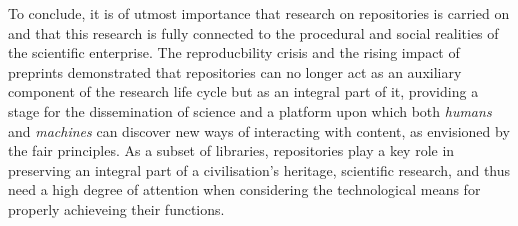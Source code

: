 To conclude, it is of utmost importance that research on repositories is carried on and that this research is fully connected to the procedural and social realities of the scientific enterprise. The reproducbility crisis and the rising impact of preprints demonstrated that repositories can no longer act as an auxiliary component of the research life cycle but as an integral part of it, providing a stage for the dissemination of science and a platform upon which both \emph{humans} and \emph{machines} can discover new ways of interacting with content, as envisioned by the \gls{fair} principles. As a subset of libraries, repositories play a key role in preserving an integral part of a civilisation's heritage, scientific research, and thus need a high degree of attention when considering the technological means for properly achieveing their functions.